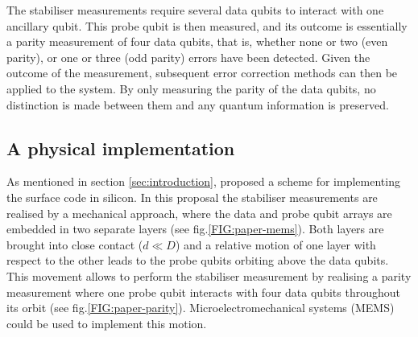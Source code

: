 The stabiliser measurements require several data qubits to interact with one ancillary qubit. This probe qubit is then measured, and its outcome is essentially a parity measurement of four data qubits, that is, whether none or two  (even parity), or one or three (odd parity) errors have been detected. Given the outcome of the measurement, subsequent error correction methods can then be applied to the system. By only measuring the parity of the data qubits, no distinction is made between them and any quantum information is preserved. 






\subsection{A physical implementation} \label{sec:PhysicalImplementation}
As mentioned in section \ref{sec:introduction},  \citet{OGorman2016} proposed a scheme for implementing the surface code in silicon. In this proposal the stabiliser measurements are realised by a mechanical approach, where the data and probe qubit arrays are embedded in two separate layers (see fig.\@ \ref{FIG:paper-mems}). Both layers are brought into close contact ($d\ll D$) and a relative motion of one layer with respect to the other leads to the probe qubits orbiting above the data qubits. This movement allows to perform the stabiliser measurement by realising a parity measurement where one probe qubit interacts with four data qubits throughout its orbit (see fig.\@ \ref{FIG:paper-parity}). Microelectromechanical systems (MEMS) could be used to implement this motion.



